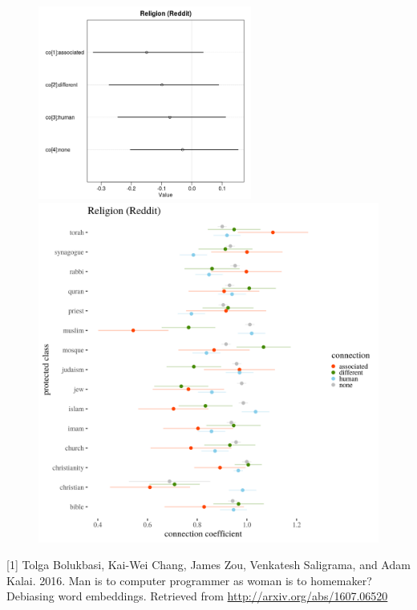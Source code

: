 \documentclass[12pt,dvipsnames,enabledeprecatedfontcommands]{scrartcl}
\begin{document}
\begin{center}
\begin{figure}[!htb]
   
  \begin{minipage}{0.38\textwidth}
\includegraphics[width=7cm]{../images/religionCoeffs.jpeg}
\end{minipage}
   \begin {minipage}{0.58\textwidth}
\includegraphics{../images/visReligionReddit.png}
   \end{minipage}
\end{figure}


\end{center}

\scriptsize

\vspace{-4mm}

\hypertarget{refs}{}
\leavevmode\hypertarget{ref-bolukbasi2016man}{}%
{[}1{]} Tolga Bolukbasi, Kai-Wei Chang, James Zou, Venkatesh Saligrama,
and Adam Kalai. 2016. Man is to computer programmer as woman is to
homemaker? Debiasing word embeddings. Retrieved from
\url{http://arxiv.org/abs/1607.06520}
\end{document}
